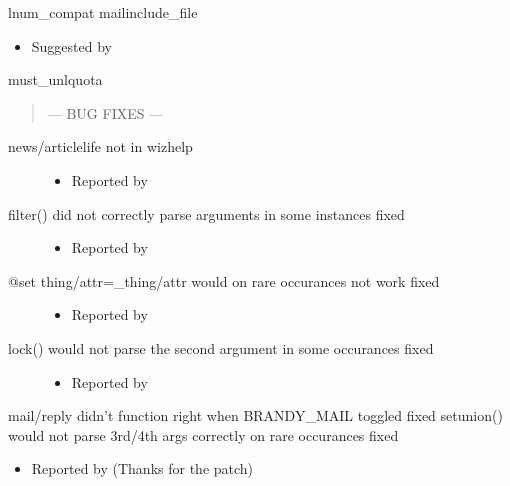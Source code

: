 \documentclass[letterpaper,10pt,english]{sphinxmanual}
\begin{document}
\sphinxAtStartPar
lnum\_compat
mailinclude\_file
\begin{itemize}
\item {} 
\sphinxAtStartPar
Suggested by 

\end{itemize}

\sphinxAtStartPar
must\_unlquota
\begin{quote}

\sphinxAtStartPar
— BUG FIXES —
\end{quote}
\begin{description}
\item[{news/articlelife not in wizhelp}] \leavevmode\begin{itemize}
\item {} 
\sphinxAtStartPar
Reported by 

\end{itemize}

\item[{filter() did not correctly parse arguments in some instances \textendash{} fixed}] \leavevmode\begin{itemize}
\item {} 
\sphinxAtStartPar
Reported by 

\end{itemize}

\item[{@set thing/attr=\_thing/attr would on rare occurances not work \textendash{} fixed}] \leavevmode\begin{itemize}
\item {} 
\sphinxAtStartPar
Reported by 

\end{itemize}

\item[{lock() would not parse the second argument in some occurances \textendash{} fixed}] \leavevmode\begin{itemize}
\item {} 
\sphinxAtStartPar
Reported by 

\end{itemize}

\end{description}

\sphinxAtStartPar
mail/reply didn’t function right when BRANDY\_MAIL toggled \textendash{} fixed
setunion() would not parse 3rd/4th args correctly on rare occurances \textendash{}fixed
\begin{itemize}
\item {} 
\sphinxAtStartPar
Reported by  (Thanks for the patch)

\end{itemize}
\end{document}
